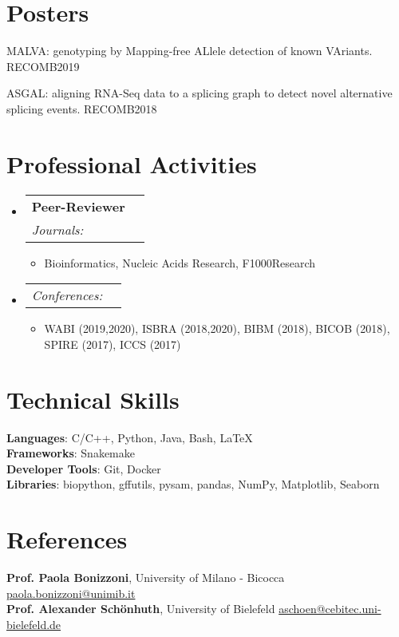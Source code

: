 \documentclass[letterpaper,11pt]{article}
\makeatletter
\newcommand{\resumeItem}[1]{
  \item\small{
    {#1 \vspace{-2pt}}
  }
}
\newcommand{\resumeSubheading}[4]{
  \vspace{-2pt}\item
    \begin{tabular*}{0.97\textwidth}[t]{l@{\extracolsep{\fill}}r}
      \textbf{#1} & #2 \\
      \textit{\small#3} & \textit{\small #4} \\
    \end{tabular*}\vspace{-7pt}
}
\newcommand{\resumeSubSubheading}[2]{
    \item
    \begin{tabular*}{0.97\textwidth}{l@{\extracolsep{\fill}}r}
      \textit{\small#1} & \textit{\small #2} \\
    \end{tabular*}\vspace{-7pt}
}
\newcommand{\resumeSubHeadingListStart}{\begin{itemize}[leftmargin=0.15in, label={}]}
\newcommand{\resumeSubHeadingListEnd}{\end{itemize}}
\newcommand{\resumeItemListStart}{\begin{itemize}}
\newcommand{\resumeItemListEnd}{\end{itemize}\vspace{-5pt}}
\makeatother
\begin{document}
\section{Posters}
{\small
\begin{etaremune}
    \item MALVA: genotyping by Mapping-free ALlele detection of known VAriants. RECOMB2019
    \item ASGAL: aligning RNA-Seq data to a splicing graph to detect novel alternative splicing events. RECOMB2018
\end{etaremune}
}

\section{Professional Activities}
\resumeSubHeadingListStart
    \resumeSubheading
      {Peer-Reviewer}{}
      {Journals:}{}
      \resumeItemListStart
        \resumeItem{Bioinformatics, Nucleic Acids Research, F1000Research}
      \resumeItemListEnd
    \resumeSubSubheading
      {Conferences:}{}
      \resumeItemListStart
        \resumeItem{WABI (2019,2020), ISBRA (2018,2020), BIBM (2018), BICOB (2018), SPIRE (2017), ICCS (2017)}
      \resumeItemListEnd      
\resumeSubHeadingListEnd


\section{Technical Skills}
 \begin{itemize}[leftmargin=0.15in, label={}]
    \small{\item{
     \textbf{Languages}{: C/C++, Python, Java, Bash, \LaTeX} \\
     \textbf{Frameworks}{: Snakemake} \\
     \textbf{Developer Tools}{: Git, Docker} \\
     \textbf{Libraries}{: biopython, gffutils, pysam, pandas, NumPy, Matplotlib, Seaborn}
    }}
 \end{itemize}

\section{References}
 \begin{itemize}[leftmargin=0.15in, label={}]
    \small{\item{
     \textbf{Prof. Paola Bonizzoni}{, University of Milano - Bicocca \hfill \href{mailto:paola.bonizzoni@unimib.it}{paola.bonizzoni@unimib.it}}\\
     \textbf{Prof. Alexander Sch\"{o}nhuth}{, University of Bielefeld \hfill \href{mailto:aschoen@cebitec.uni-bielefeld.de}{aschoen@cebitec.uni-bielefeld.de}}
    }}
 \end{itemize}
 
\end{document}
